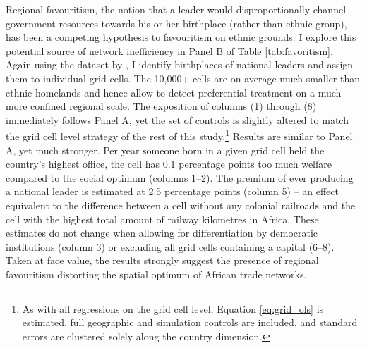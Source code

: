 \documentclass[11pt, oneside]{article}   	%
\begin{document}
Regional favouritism, the notion that a leader would disproportionally channel government resources towards his or her birthplace (rather than ethnic group), has been a competing hypothesis to favouritism on ethnic grounds. I explore this potential source of network inefficiency in Panel B of Table \eqref{tab:favoritism}. Again using the dataset by \cite{Dreher_AiddemandAfrican_2016}, I identify birthplaces of national leaders and assign them to individual grid cells. The 10,000+ cells are on average much smaller than ethnic homelands and hence allow to detect preferential treatment on a much more confined regional scale. The exposition of columns (1) through (8) immediately follows Panel A, yet the set of controls is slightly altered to match the grid cell level strategy of the rest of this study.\footnote{As with all regressions on the grid cell level, Equation \eqref{eq:grid_ols} is estimated, full geographic and simulation controls are included, and standard errors are clustered solely along the country dimension.} Results are similar to Panel A, yet much stronger. Per year someone born in a given grid cell held the country's highest office, the cell has 0.1 percentage points too much welfare compared to the social optimum (columns 1--2). The premium of ever producing a national leader is estimated at 2.5 percentage points (column 5) -- an effect equivalent to the difference between a cell without any colonial railroads and the cell with the highest total amount of railway kilometres in Africa. These estimates do not change when allowing for differentiation by democratic institutions (column 3) or excluding all grid cells containing a capital (6--8). Taken at face value, the results strongly suggest the presence of regional favouritism distorting the spatial optimum of African trade networks.
\end{document}
